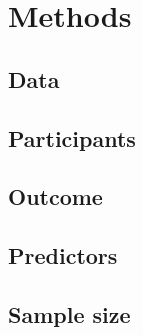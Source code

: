 \chapter{Methods}

\section{Data}

\section{Participants}

\section{Outcome}

\section{Predictors}

\section{Sample size}

